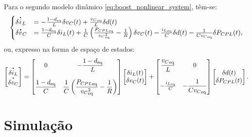 Para o segundo modelo dinâmico \eqref{eq:boost_nonlinear_system}, têm-se: \begin{equation} \begin{cases} \delta \dt{i}_L &= - \frac{1 - d_{\text{eq}}}{L} \delta v_C(t) + \frac{{v_C}_{\text{eq}}}{L}\delta d(t) \\ \delta \dt{v}_C &= \frac{1 - d_{\text{eq}}}{C} \delta i_L(t) + \frac{1}{C} \left(\frac{{P_{CPL}}_{\text{eq}}}{{v_C}^2_{\text{eq}}} - \frac{1}{R}\right) \delta v_C(t) - \frac{{i_L}_{\text{eq}}}{C} \delta d(t) - \frac{1}{C{v_C}_{\text{eq}}} \delta P_{CPL}(t), \end{cases} \end{equation} ou, expresso na forma de espaço de estados: \begin{equation} \begin{bmatrix} \dt{\delta i_L} \\ \dt{\delta v_C} \end{bmatrix} = \begin{bmatrix} \displaystyle 0 & \displaystyle -\frac{1 - d_{\text{eq}}}{L}  \\\\ \displaystyle \frac{1 - d_{\text{eq}}}{C} & \displaystyle \frac{1}{C}\left(\frac{{P_{CPL}}_{\text{eq}}}{{{v_{C}}^2_{\text{eq}}}} - \frac{1}{R}\right) \end{bmatrix} \begin{bmatrix} \delta i_L(t) \\ \delta v_C(t) \end{bmatrix} + \begin{bmatrix} {\displaystyle \frac{{v_C}_{\text{eq}}}{L}} & 0 \\ \\ - \frac{{i_L}_{\text{eq}}}{C} & \displaystyle {-\frac{1}{C{v_C}_{\text{eq}}}} \end{bmatrix}  \begin{bmatrix} \delta d(t) \\ \delta P_{CPL}(t) \end{bmatrix}. \label{eq:boost_linear_system}\end{equation}

\section{Simulação}



